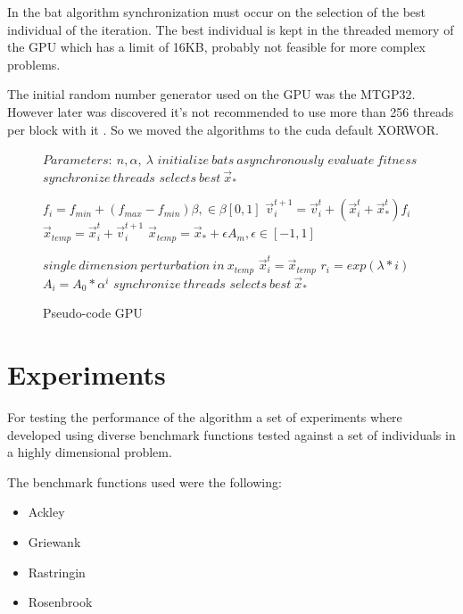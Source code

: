 \documentclass[conference]{IEEEtran}
\begin{document}
In the bat algorithm synchronization must occur on the selection of the
best individual of the iteration. The best individual is kept in the
threaded memory of the GPU which has a limit of 16KB, probably not feasible for
more complex problems.

The initial random number generator used on the GPU was the MTGP32.
However later was discovered it's not recommended to use more than 256
threads per block with it \cite{curandIssue}. So we moved the algorithms
to the cuda default XORWOR.

\begin{figure}
\begin{algorithmic}[1]
\State $Parameters:\ n,\alpha,\ \lambda$
\State $initialize\ bats\ asynchronously$
\State $evaluate\ fitness$
\State $synchronize\ threads$
\State $selects\ best\ \vec{x}_*$

        \State $f_i=f_{min} + (f_{max} - f_{min})\beta, \in \beta [0,1]$
        \State $\vec{v}_i^{t+1} = \vec{v}_i^{t} + (\vec{x}_i^{t} + \vec{x}_*^{t})f_i$
        \State $\vec{x}_{temp} = \vec{x}_i^{t} + \vec{v}_i^{t+1}$
            \State $\vec{x}_{temp} = \vec{x}_* + \epsilon A_m, \epsilon \in [-1, 1]$
        \EndIf

        \State $single\ dimension\ perturbation\ in\ x_{temp}$
            \State $\vec{x}_i^t = \vec{x}_{temp}$
            \State $r_i = exp(\lambda * i)$
            \State $A_i =  A_{0} * \alpha^i$
        \EndIf
    \EndFor
    \State $synchronize\ threads$
    \State $selects\ best\ \vec{x}_*$
\EndWhile
\end{algorithmic}
\caption{Pseudo-code GPU}\label{gpu-pseudo}
\end{figure}


\section{Experiments} \label{experiments}%

For testing the performance of the algorithm a set of experiments where
developed using diverse benchmark functions tested against a set of
individuals in a highly dimensional problem.

The benchmark functions used were the following:

\begin{itemize}
    \item Ackley
    \item Griewank
    \item Rastringin
    \item Rosenbrook
\end{itemize}
\end{document}
